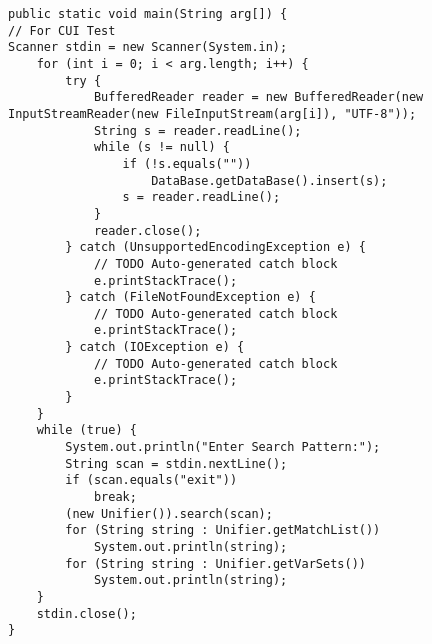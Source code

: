 \documentclass{jarticle}
\begin{document}
\begin{lstlisting}[caption=Unifyクラスより抜粋]
public static void main(String arg[]) {
// For CUI Test
Scanner stdin = new Scanner(System.in);
    for (int i = 0; i < arg.length; i++) {
        try {
            BufferedReader reader = new BufferedReader(new InputStreamReader(new FileInputStream(arg[i]), "UTF-8"));
            String s = reader.readLine();
            while (s != null) {
                if (!s.equals(""))
                    DataBase.getDataBase().insert(s);
                s = reader.readLine();
            }
            reader.close();
        } catch (UnsupportedEncodingException e) {
            // TODO Auto-generated catch block
            e.printStackTrace();
        } catch (FileNotFoundException e) {
            // TODO Auto-generated catch block
            e.printStackTrace();
        } catch (IOException e) {
            // TODO Auto-generated catch block
            e.printStackTrace();
        }
    }
    while (true) {
        System.out.println("Enter Search Pattern:");
        String scan = stdin.nextLine();
        if (scan.equals("exit"))
            break;
        (new Unifier()).search(scan);
        for (String string : Unifier.getMatchList())
            System.out.println(string);
        for (String string : Unifier.getVarSets())
            System.out.println(string);
    }
    stdin.close();
}
\end{lstlisting}
\end{document}

